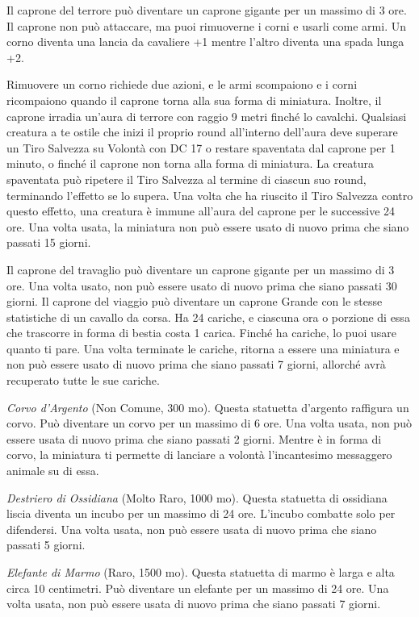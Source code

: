 \begin{multicols}{2}
Il caprone del terrore può diventare un caprone gigante per un massimo di 3 ore. Il caprone non può attaccare, ma puoi rimuoverne i corni e usarli come armi. Un corno diventa una lancia da cavaliere +1 mentre l'altro diventa una spada lunga +2.

Rimuovere un corno richiede due azioni, e le armi scompaiono e i corni ricompaiono quando il caprone torna alla sua forma di miniatura. Inoltre, il caprone irradia un'aura di terrore con raggio 9 metri finché lo cavalchi. Qualsiasi creatura a te ostile che inizi il proprio round all'interno dell'aura deve superare un Tiro Salvezza su Volontà con DC 17 o restare
spaventata dal caprone per 1 minuto, o finché il caprone non torna alla forma di miniatura. La creatura spaventata può ripetere il Tiro Salvezza al termine di ciascun suo round, terminando l'effetto se lo supera. Una volta che ha riuscito il Tiro Salvezza contro questo effetto, una creatura è immune all'aura del caprone per le successive 24 ore. Una volta usata, la miniatura non può essere usato di nuovo prima che siano passati 15 giorni.

Il caprone del travaglio può diventare un caprone gigante per un massimo di 3 ore. Una volta usato, non può essere usato di nuovo prima che siano passati 30 giorni.
Il caprone del viaggio può diventare un caprone Grande con le stesse statistiche di un cavallo da corsa. Ha 24 cariche, e ciascuna ora o porzione di essa che trascorre in forma di bestia costa 1 carica. Finché ha cariche, lo puoi usare quanto ti pare. Una volta terminate le cariche, ritorna a essere una miniatura e non può essere usato di nuovo prima che siano passati 7 giorni, allorché avrà recuperato tutte le sue cariche.

\textit{Corvo d'Argento} (Non Comune, 300 mo). Questa statuetta d'argento raffigura un corvo. Può diventare un corvo per un massimo di 6 ore. Una volta usata, non può essere usata di nuovo prima che siano passati 2 giorni. Mentre è in forma di corvo, la miniatura ti permette di lanciare a volontà l'incantesimo messaggero animale su di essa.

\textit{Destriero di Ossidiana} (Molto Raro, 1000 mo). Questa statuetta di ossidiana liscia diventa un incubo per un massimo di 24 ore. L'incubo combatte solo per difendersi. Una volta usata, non può essere usata di nuovo prima che siano passati 5 giorni.

\textit{Elefante di Marmo} (Raro, 1500 mo). Questa statuetta di marmo è larga e alta circa 10 centimetri. Può diventare un elefante per un massimo di 24 ore. Una volta usata, non può essere usata di nuovo prima che siano passati 7 giorni.


\end{multicols}
